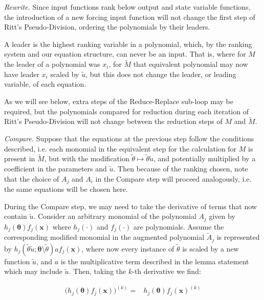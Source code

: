 \documentclass[a4paper,fleqn]{cas-dc}
\theoremstyle{definition}
\begin{document}
\begin{pf}
    \vspace{0.2cm}
    \noindent \textit{Rewrite.} Since input functions rank below output and state variable functions, the introduction of a new forcing input function will not change the first step of Ritt's Pseudo-Division, ordering the polynomials by their leaders. 
    
    A leader is the highest ranking variable in a polynomial, which, by the ranking system and our equation structure, can never be an input.
    That is, where for $M$ the leader of a polynomial was $x_i$, for $\tilde{M}$ that equivalent polynomial may now have leader $x_i$ scaled by $\tilde{u}$, but this does not change the leader, or leading variable, of each equation.
    
    As we will see below, extra steps of the Reduce-Replace sub-loop may be required, but the polynomials compared for reduction during each iteration of Ritt's Pseudo-Division will not change between the reduction steps of $M$ and $\tilde{M}$.

    \vspace{0.2cm}
    \noindent \textit{Compare.} Suppose that the equations at the previous step follow the conditions described, i.e. each monomial in the equivalent step for the calculation for $M$ is present in $\tilde{M}$, but with the modification $\tilde{\theta} \mapsto \tilde{\theta}\tilde{u}$, and potentially multiplied by a coefficient in the parameters and $\tilde{u}$. Then because of the ranking chosen, note that the choice of $A_j$ and $A_i$ in the Compare step will proceed analogously, i.e. the same equations will be chosen here.
    
    During the Compare step, we may need to take the derivative of terms that now contain $\tilde{u}$. 
    Consider an arbitrary monomial of the polynomial $A_j$ given by $h_j(\pmb{\theta}) f_j(\pmb{x})$ where $h_j(\cdot)$ and $f_j(\cdot)$ are polynomials. 
    Assume the corresponding modified monomial in the augmented polynomial $\tilde{A}_j$ is represented by $h_j(\tilde{\theta} \tilde{u}; \pmb{\theta}\setminus \tilde{\theta}) a f_j(\pmb{x}) $, where now every instance of $\tilde{\theta}$ is scaled by a new function $\tilde{u}$, and $a$ is the multiplicative term described in the lemma statement which may include $\tilde{u}$.
    Then, taking the $k$-th derivative we find:
    \begin{fleqn}
    \begin{align}
        \big(h_j(\pmb{\theta}) f_j(\pmb{x})\big)^{(k)} =& h_j(\pmb{\theta}) f_j(\pmb{x})^{(k)} \label{orgder}
    \end{align}


\end{fleqn}
\end{pf}
\end{document}
